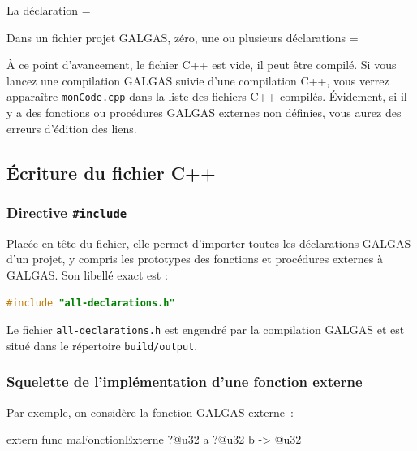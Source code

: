 La déclaration \ggsq=%

Dans un fichier projet GALGAS, zéro, une ou plusieurs déclarations \ggsq=%

À ce point d'avancement, le fichier C++ est vide, il peut être compilé. Si vous lancez une compilation GALGAS suivie d'une compilation C++, vous verrez apparaître \texttt{monCode.cpp} dans la liste des fichiers C++ compilés. Évidement, si il y a des fonctions ou procédures GALGAS externes non définies, vous aurez des erreurs d'édition des liens.





\subsection{Écriture du fichier C++}


\subsubsection{Directive \texttt{\#include}}

Placée en tête du fichier, elle permet d'importer toutes les déclarations GALGAS d'un projet, y compris les prototypes des fonctions et procédures externes à GALGAS. Son libellé exact est :

\begin{lstlisting}[language=C++]
#include "all-declarations.h"
\end{lstlisting}

Le fichier \texttt{all-declarations.h} est engendré par la compilation GALGAS et est situé dans le répertoire \texttt{build/output}.



\subsubsection{Squelette de l'implémentation d'une fonction externe}

Par exemple, on considère la fonction GALGAS externe~:
\begin{galgas4}
extern func maFonctionExterne ?@u32 a ?@u32 b -> @u32
\end{galgas4}

